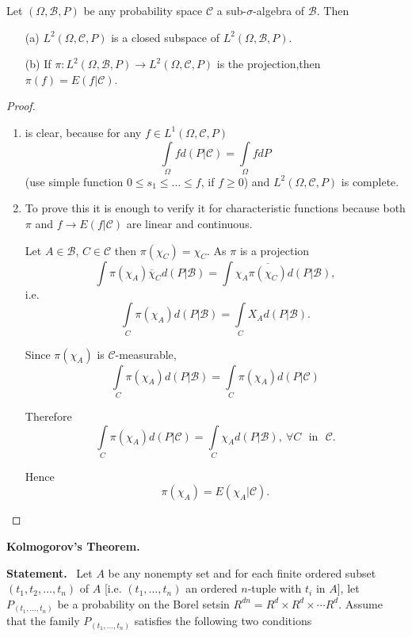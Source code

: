 \begin{lemma*}
Let $(\Omega,\mathscr{B},P)$ be any probability space $\mathscr{C}$ a
sub-$\sigma$-algebra of $\mathscr{B}$. Then
\begin{itemize}
\item[\rm(a)] $L^{2}(\Omega,\mathscr{C},P)$ is a closed subspace of
  $L^{2}(\Omega,\mathscr{B},P)$.

\item[\rm(b)] If $\pi:L^{2}(\Omega,\mathscr{B},P)\to
  L^{2}(\Omega,\mathscr{C},P)$ is the projection,then
  $\pi(f)=E(f|\mathscr{C})$. 
\end{itemize}
\end{lemma*}

\begin{proof}
\begin{enumerate}
\renewcommand{\theenumi}{\alph{enumi}}
\renewcommand{\labelenumi}{(\theenumi)}
\item is clear, because for any $f\in L^{1}(\Omega,\mathscr{C},P)$
$$
\int\limits_{\Omega}fd(P|\mathscr{C})=\int\limits_{\Omega}fdP
$$\pageoriginale
(use simple function $0\leq s_{1}\leq \ldots \leq f$, if $f\geq 0$)
and $L^{2}(\Omega,\mathscr{C},P)$ is complete.

\item To prove this it is enough to verify it for characteristic
  functions because both $\pi$ and $f\to E(f|\mathscr{C})$ are linear
  and continuous.

Let $A\in \mathscr{B}$, $C\in \mathscr{C}$ then
$\pi(\chi_{C})=\chi_{C}$. As $\pi$ is a projection
$$
\int \pi(\chi_{A})\overline{\chi}_{C}d(P|\mathscr{B})=\int
\chi_{A}\overline{\pi(\chi_{C})}d(P|\mathscr{B}), 
$$
i.e.
$$
\int\limits_{C}\pi(\chi_{A})d(P|\mathscr{B})=\int\limits_{C}X_{A}d(P|\mathscr{B}). 
$$

Since $\pi(\chi_{A})$ is $\mathscr{C}$-measurable,
$$
\int\limits_{C}\pi(\chi_{A})d(P|\mathscr{B})=\int\limits_{C}\pi(\chi_{A})d(P|\mathscr{C}) 
$$

Therefore
$$
\int\limits_{C}\pi(\chi_{A})d(P|\mathscr{C})=\int\limits_{C}\chi_{A}d(P|\mathscr{B}),\ \forall
C \text{~ in~ }\mathscr{C}.
$$

Hence
$$
\pi(\chi_{A})=E(\chi_{A}|\mathscr{C}).
$$
\end{enumerate}
\end{proof}

\noindent
{\bf Kolmogorov's Theorem.}
\smallskip

\noindent
{\bf Statement.}~ Let $A$ be any nonempty set and for each finite
ordered subset $(t_{1},t_{2},\ldots,t_{n})$ of $A$
[i.e. $(t_{1},\ldots,t_{n})$ an ordered $n$-tuple with $t_{i}$ in
  $A$], let $P_{(t_{1},\ldots,t_{n})}$ be a probability on the Borel
sets\pageoriginale in $R^{dn}=R^{d}\times R^{d}\times\cdots
R^{d}$. Assume that the family $P_{(t_{1},\ldots,t_{n})}$ satisfies
the following two conditions

